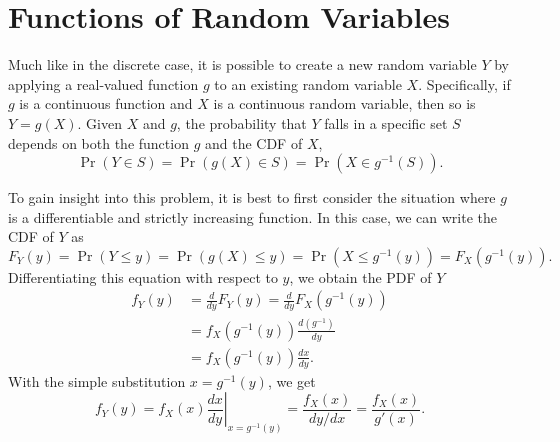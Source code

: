 \section{Functions of Random Variables}

Much like in the discrete case, it is possible to create a new random variable $Y$ by applying a real-valued function $g$ to an existing random variable $X$.
Specifically, if $g$ is a continuous function and $X$ is a continuous random variable, then so is $Y = g(X)$.
Given $X$ and $g$, the probability that $Y$ falls in a specific set $S$ depends on both the function $g$ and the CDF of $X$,
\begin{equation*}
\Pr (Y \in S) = \Pr (g(X) \in S) 
= \Pr (X \in g^{-1}(S)).
\end{equation*}

To gain insight into this problem, it is best to first consider the situation where $g$ is a differentiable and strictly increasing function.
In this case, we can write the CDF of $Y$ as
\begin{equation*}
F_Y(y) = \Pr (Y \leq y) = \Pr (g(X) \leq y)
= \Pr \left( X \leq g^{-1}(y) \right)
= F_X \left( g^{-1} (y) \right) .
\end{equation*}
Differentiating this equation with respect to $y$, we obtain the PDF of $Y$
\begin{equation*}
\begin{split}
f_Y (y) &= \frac{d}{dy} F_Y(y)
= \frac{d}{dy} F_X \left( g^{-1} (y) \right) \\
&= f_X \left( g^{-1} (y) \right) \frac{d \left( g^{-1} \right)}{dy} \\
&= f_X \left( g^{-1} (y) \right) \frac{dx}{dy} .
\end{split}
\end{equation*}
With the simple substitution $x = g^{-1} (y)$, we get
\begin{equation*}
f_Y (y) = f_X (x) \left. \frac{dx}{dy} \right|_{x = g^{-1}(y)}
= \frac{f_X (x)}{{dy}/{dx}}
= \frac{f_X (x)}{g'(x)} .
\end{equation*}

